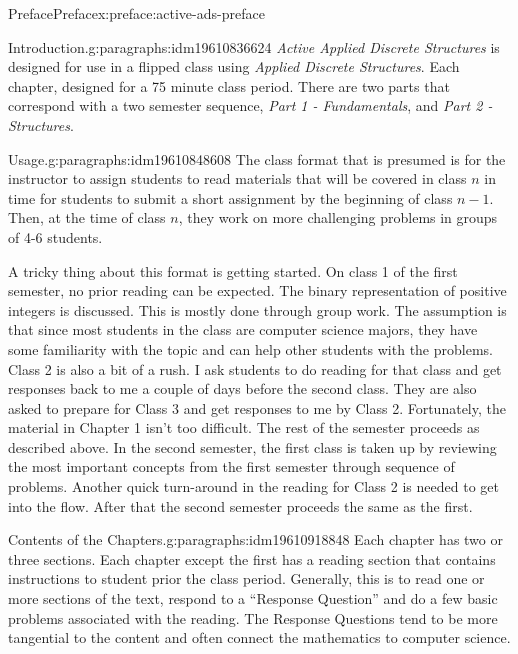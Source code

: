 \documentclass[oneside,10pt,]{book}
\numberwithin{equation}{section}
\begin{document}
\begin{preface}{Preface}{}{Preface}{}{}{x:preface:active-ads-preface}
\begin{paragraphs}{Introduction.}{g:paragraphs:idm19610836624}%
\emph{Active Applied Discrete Structures} is designed for use in a flipped class using \emph{Applied Discrete Structures}. Each chapter, designed for a 75 minute class period.  There are two parts that correspond with a two semester sequence, \emph{Part 1 - Fundamentals}, and \emph{Part 2 - Structures}.%
\end{paragraphs}%
\begin{paragraphs}{Usage.}{g:paragraphs:idm19610848608}%
The class format that is presumed is for the instructor to assign students to read materials that will be covered in class \(n\) in time for students to submit a short assignment by the beginning of class \(n-1\). Then, at the time of class \(n\), they work on more challenging problems in groups of 4-6 students.%
\par
A tricky thing about this format is getting started. On class 1 of the first semester, no prior reading can be expected. The binary representation of positive integers is discussed. This is mostly done through group work. The assumption is that since most students in the class are computer science majors, they have some familiarity with the topic and can help  other students with the problems. Class 2 is also a bit of a rush. I ask students to do reading for that class and get responses back to me a couple of days before the second class. They are also asked to prepare for Class 3 and get responses to me by Class 2.   Fortunately, the material in Chapter 1 isn't too difficult.  The rest of the semester proceeds as described above. In the second semester, the first class is taken up by reviewing the most important concepts from the first semester through sequence of problems. Another quick turn-around in the reading for Class 2 is needed to get into the flow.  After that the second semester proceeds the same as the first.%
\end{paragraphs}%
\begin{paragraphs}{Contents of the Chapters.}{g:paragraphs:idm19610918848}%
Each chapter has two or three sections.  Each chapter except the first has a reading section that contains instructions to student prior the class period. Generally, this is to read one or more sections of the text, respond to a ``Response Question'' and do a few basic problems associated with the reading.  The Response Questions tend to be more tangential to the content and often connect the mathematics to computer science.%

\end{paragraphs}
\end{preface}
\end{document}
